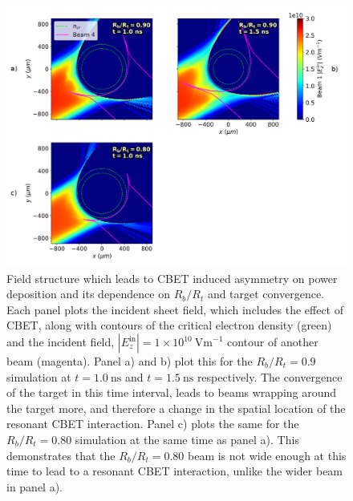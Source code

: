 \begin{figure}[t!]
    \includegraphics[width=\linewidth]{Results1/Images/Field_profiles_alt.png}
    \centering
    \caption{Field structure which leads to \ac{CBET} induced asymmetry on power deposition and its dependence on $R_b/R_t$ and target convergence.
    Each panel plots the incident sheet field, which includes the effect of \ac{CBET}, along with contours of the critical electron density (green) and the incident field, $|E_z^{\text{in}}|=1\times10^{10}\ \text{Vm}^{-1}$ contour of another beam (magenta).
    Panel a) and b) plot this for the $R_b/R_t=0.9$ simulation at $t=1.0\ \text{ns}$ and $t=1.5\ \text{ns}$ respectively.
    The convergence of the target in this time interval, leads to beams wrapping around the target more, and therefore a change in the spatial location of the resonant \ac{CBET} interaction.
    Panel c) plots the same for the $R_b/R_t=0.80$ simulation at the same time as panel a).
    This demonstrates that the $R_b/R_t=0.80$ beam is not wide enough at this time to lead to a resonant \ac{CBET} interaction, unlike the wider beam in panel a).}%
    \label{fig:Res1_field_profiles}
\end{figure}

